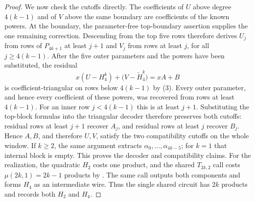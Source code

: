\begin{proof}
    We now check the cutoffs directly.  The coefficients of $U$ above
    degree $4(k-1)$ and of $V$ above the same boundary are coefficients of
    the known powers.  At the boundary, the parameter-free top-boundary
    assertion  supplies the one remaining
    correction.  Descending from the top five rows therefore derives
    $U_j$ from rows of $P_{4k+1}$ at least $j+1$ and $V_j$ from rows at least
    $j$, for all $j\ge4(k-1)$.  After the five outer parameters and the
    powers have been substituted, the residual
    \[
      x(U-H_4^k)+\bigl(V-\tilde H_4^k\bigr)=xA+B
    \]
    is coefficient-triangular on rows below $4(k-1)$ by
    (3).  Every outer parameter, and hence every coefficient
    of these powers, was recovered from rows at least $4(k-1)$.  For an inner
    row $j<4(k-1)$ this is at least $j+1$.  Substituting the top-block formulas
    into the triangular decoder therefore preserves both cutoffs: residual
    rows at least $j+1$ recover $A_j$, and residual rows at least $j$ recover
    $B_j$.  Hence $A,B$, and
    therefore $U,V$, satisfy the two compatibility cutoffs on the whole
    window.  If $k\ge2$, the same argument extracts
    $\alpha_0,\ldots,\alpha_{4k-5}$; for $k=1$ that internal block is empty.
    This proves the decoder and compatibility claims.  For the realization,
    the quadratic $H_2$ costs one product, and the shared
    $T_{2k,2}$ call costs $\mu(2k,1)=2k-1$ products by
    .  The same call outputs both components
    and forms $H_4$ as an intermediate wire.  Thus the single shared circuit
    has $2k$ products and records both $H_2$ and $H_4$.
\end{proof}

